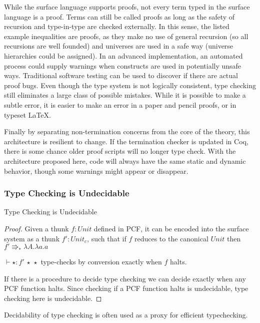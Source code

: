 
While the surface language supports proofs, not every term typed in the surface language is a proof.
Terms can still be called proofs as long as the safety of recursion and type-in-type are checked externally.
In this sense, the listed example inequalities are proofs, as they make no use of general recursion (so all recursions are well founded) and universes are used in a safe way (universe hierarchies could be assigned).
In an advanced implementation, an automated process could supply warnings when constructs are used in potentially unsafe ways.
Traditional software testing can be used to discover if there are actual proof bugs.
Even though the type system is not logically consistent, type checking still eliminates a large class of possible mistakes.
While it is possible to make a subtle error, it is easier to make an error in a paper and pencil proofs, or in typeset \LaTeX.

Finally by separating non-termination concerns from the core of the theory, this architecture is resilient to change.
If the termination checker is updated in Coq, there is some chance older proof scripts will no longer type check.
With the architecture proposed here, code will always have the same static and dynamic behavior, though some warnings might appear or disappear.

\subsubsection{Type Checking is Undecidable}
\begin{thm}
Type Checking is Undecidable
\end{thm}

\begin{proof}
Given a thunk $f:Unit$ defined in PCF, it can be encoded into the surface system as a thunk $f':Unit_{c}$, such that if $f$ reduces to the canonical $Unit$ then $f'\Rrightarrow_{\ast}\lambda A.\lambda a.a$ 

$\vdash\star:f'\,\star\,\star$ type-checks by conversion exactly when $f$ halts.

If there is a procedure to decide type checking we can decide exactly when any PCF function halts.
Since checking if a PCF function halts is undecidable, type checking here is undecidable.

\end{proof}
Decidability of type checking is often used as a proxy for efficient typechecking.

